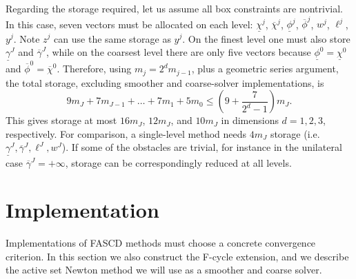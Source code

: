 \documentclass[review,hidelinks,onefignum,onetabnum]{siamart220329}
\begin{document}
Regarding the storage required, let us assume all box constraints are nontrivial. In this case, seven vectors must be allocated on each level: $\underline{\chi}^j$, $\overline{\chi}^j$, $\underline{\phi}^j$, $\overline{\phi}^j$, $w^j$, $\ell^j$, $y^j$.  Note $z^j$ can use the same storage as $y^j$.  On the finest level one must also store $\underline{\gamma}^J$ and $\overline{\gamma}^J$, while on the coarsest level there are only five vectors because $\underline{\phi}^0=\underline{\chi}^0$ and $\overline{\phi}^0=\overline{\chi}^0$.  Therefore, using $m_j=2^d m_{j-1}$, plus a geometric series argument, the total storage, excluding smoother and coarse-solver implementations, is
\begin{equation}
9 m_J + 7 m_{J-1} + \dots + 7 m_1 + 5 m_0 \le \left(9 + \frac{7}{2^d - 1}\right) m_J.
\end{equation}
This gives storage at most $16m_J$, $12m_J$, and $10m_J$ in dimensions $d=1,2,3$, respectively.  For comparison, a single-level method needs $4 m_J$ storage (i.e.~$\underline{\gamma}^J,\overline{\gamma}^J,\ell^J,w^J$).  If some of the obstacles are trivial, for instance in the unilateral case $\overline{\gamma}^J=+\infty$, storage can be correspondingly reduced at all levels.


\section{Implementation} \label{sec:implementation}

Implementations of FASCD methods must choose a concrete convergence criterion.  In this section we also construct the F-cycle extension, and we describe the active set Newton method we will use as a smoother and coarse solver.
\end{document}
